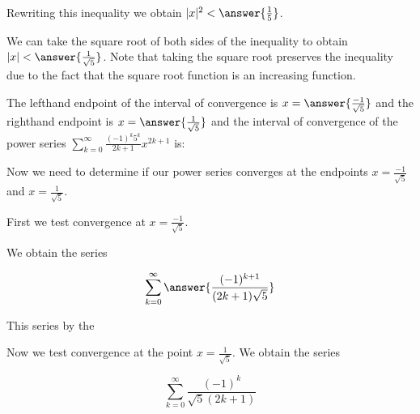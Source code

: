 \documentclass{ximera}
\begin{document}
\begin{exercise}
\begin{exercise}
\begin{hint}
Rewriting this inequality we obtain $|x|^2< \answer{\frac{1}{5}}$. 

We can take the square root of both sides of the inequality to obtain $|x|<\answer{\frac{1}{\sqrt{5}}}$. Note that taking the square root preserves the inequality due to the fact that the square root function is an increasing function.

\end{hint}








\begin{exercise}

The lefthand endpoint of the interval of convergence is $x=\answer{\frac{-1}{\sqrt{5}}}$ and the righthand endpoint is $x= \answer{\frac{1}{\sqrt{5}}}$ and the interval of convergence of the power series $\sum_{k=0}^{\infty} \frac{(-1)^k 5^k }{2k+1}x^{2k+1}$ is:
\begin{multipleChoice}
\choice{$\left(-\frac{1}{\sqrt{5}},\frac{1}{\sqrt{5}}\right]$}
\choice{$\left[-\frac{1}{\sqrt{5}},\frac{1}{\sqrt{5}}\right)$}
\end{multipleChoice}


\begin{hint}



 Now we need to determine if our power series converges at the endpoints $x=\frac{-1}{\sqrt{5}}$ and $x=\frac{1}{\sqrt{5}}$. 

First we test convergence at $x=\frac{-1}{\sqrt{5}}$. 

We obtain the series

\[
\sum^{\infty}_{k=0} \answer{\frac{(-1)^{k+1}}{(2k+1)\sqrt{5}}}
\]


This series  by the 

\begin{multipleChoice}
\end{multipleChoice}


Now we test convergence at the point  $x=\frac{1}{\sqrt{5}}$. We obtain the series

\[
\sum^{\infty}_{k=0} \frac{(-1)^k}{\sqrt{5}(2k+1)}
\]



\end{hint}
\end{exercise}
\end{exercise}
\end{exercise}
\end{document}
